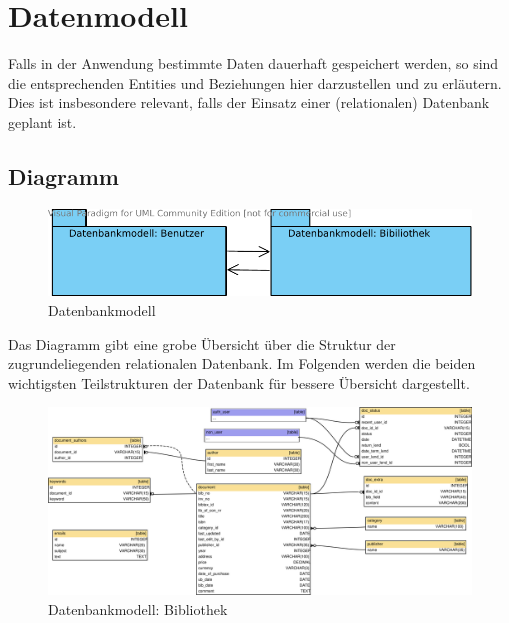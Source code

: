 \chapter{Datenmodell}
Falls in der Anwendung bestimmte Daten dauerhaft gespeichert werden, so sind
die entsprechenden Entities und Beziehungen hier darzustellen und zu erl\"autern.
Dies ist insbesondere relevant, falls der Einsatz einer (relationalen)
Datenbank geplant ist.

\section{Diagramm}


\begin{figure}[H]
\includegraphics[width=1.0\linewidth]{bilder/db_wirelib-packages.pdf}
\caption{Datenbankmodell}
\label{fig:DBDiagramm}
\end{figure}

Das Diagramm gibt eine grobe Übersicht über die Struktur der zugrundeliegenden
relationalen Datenbank. Im Folgenden werden die beiden wichtigsten
Teilstrukturen der Datenbank für bessere Übersicht dargestellt.


\begin{figure}[H]
\includegraphics[width=1.0\linewidth]{bilder/database-wirelib_cluster-doc.pdf}
\caption{Datenbankmodell: Bibliothek}
\label{fig:DB_docDiagramm}
\end{figure}

